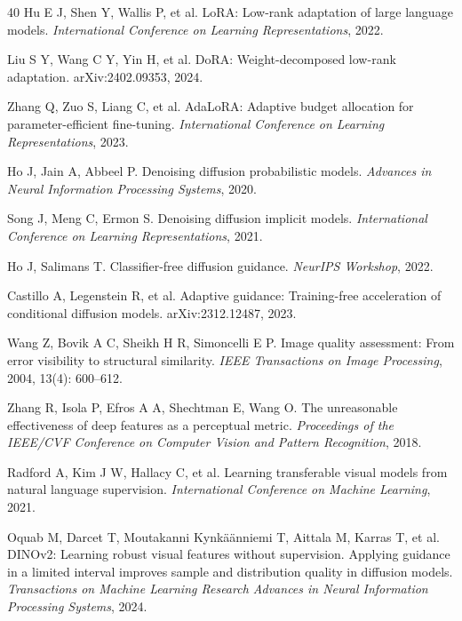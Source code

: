 \documentclass[times,twocolumn,final]{elsarticle}
\providecommand{\DIFadd}[1]{{\protect\color{blue} \sf #1}} %
\providecommand{\DIFdel}[1]{{\protect\color{red} \scriptsize #1}} %
\providecommand{\DIFaddbegin}{} %
\providecommand{\DIFaddend}{} %
\providecommand{\DIFdelbegin}{} %
\providecommand{\DIFdelend}{} %
\newcommand{\DIFscaledelfig}{0.5}
\newlength{\DIFdelgraphicswidth} %
\newlength{\DIFdelgraphicsheight} %
\newcommand{\DIFaddincludegraphics}[2][]{{\color{blue}\fbox{\DIFOincludegraphics[#1]{#2}}}} %
\newcommand{\DIFdelincludegraphics}[2][]{%
\sbox{\DIFdelgraphicsbox}{\DIFOincludegraphics[#1]{#2}}%
\settoboxwidth{\DIFdelgraphicswidth}{\DIFdelgraphicsbox} %
\settoboxtotalheight{\DIFdelgraphicsheight}{\DIFdelgraphicsbox} %
\scalebox{\DIFscaledelfig}{%
\parbox[b]{\DIFdelgraphicswidth}{\usebox{\DIFdelgraphicsbox}\\[-\baselineskip] \rule{\DIFdelgraphicswidth}{0em}}\llap{\resizebox{\DIFdelgraphicswidth}{\DIFdelgraphicsheight}{%
\setlength{\unitlength}{\DIFdelgraphicswidth}%
\begin{picture}(1,1)%
\thicklines\linethickness{2pt} %
{\color[rgb]{1,0,0}\put(0,0){\framebox(1,1){}}}%
{\color[rgb]{1,0,0}\put(0,0){\line( 1,1){1}}}%
{\color[rgb]{1,0,0}\put(0,1){\line(1,-1){1}}}%
\end{picture}%
}\hspace*{3pt}}} %
} %
\DeclareRobustCommand{\DIFaddbegin}{\DIFOaddbegin \let\includegraphics\DIFaddincludegraphics} %
\DeclareRobustCommand{\DIFaddend}{\DIFOaddend \let\includegraphics\DIFOincludegraphics} %
\DeclareRobustCommand{\DIFdelbegin}{\DIFOdelbegin \let\includegraphics\DIFdelincludegraphics} %
\DeclareRobustCommand{\DIFdelend}{\DIFOaddend \let\includegraphics\DIFOincludegraphics} %
\begin{document}
\begin{thebibliography}{40}
Hu E J, Shen Y, Wallis P, et al. LoRA: Low-rank adaptation of large language models. \textit{International Conference on Learning Representations}, 2022.

Liu S Y, Wang C Y, Yin H, et al. DoRA: Weight-decomposed low-rank adaptation. arXiv:2402.09353, 2024.

Zhang Q, Zuo S, Liang C, et al. AdaLoRA: Adaptive budget allocation for parameter-efficient fine-tuning. \textit{International Conference on Learning Representations}, 2023.

Ho J, Jain A, Abbeel P. Denoising diffusion probabilistic models. \textit{Advances in Neural Information Processing Systems}, 2020.

Song J, Meng C, Ermon S. Denoising diffusion implicit models. \textit{International Conference on Learning Representations}, 2021.

Ho J, Salimans T. Classifier-free diffusion guidance. \textit{NeurIPS Workshop}, 2022.

Castillo A, Legenstein R, et al. Adaptive guidance: Training-free acceleration of conditional diffusion models. arXiv:2312.12487, 2023.

\DIFdelbegin %
\DIFdel{Wang Z, Bovik A C, Sheikh H R, Simoncelli E P. Image quality assessment: From error visibility to structural similarity. \textit{IEEE Transactions on Image Processing}, 2004, 13(4): 600--612.
}%

\DIFdel{Zhang R, Isola P, Efros A A, Shechtman E, Wang O. The unreasonable effectiveness of deep features as a perceptual metric. \textit{Proceedings of the IEEE/CVF Conference on Computer Vision and Pattern Recognition}, 2018.
}%

\DIFdel{Radford A, Kim J W, Hallacy C, et al. Learning transferable visual models from natural language supervision. \textit{International Conference on Machine Learning}, 2021.
}%

\DIFdel{Oquab M, Darcet T, Moutakanni }\DIFdelend \DIFaddbegin {}
\DIFadd{Kynk\"a\"anniemi T, Aittala M, Karras }\DIFaddend T, et al. \DIFdelbegin \DIFdel{DINOv2: Learning robust visual features without supervision. }\DIFdelend \DIFaddbegin \DIFadd{Applying guidance in a limited interval improves sample and distribution quality in diffusion models. }\DIFaddend \textit{\DIFdelbegin \DIFdel{Transactions on Machine Learning Research}\DIFdelend \DIFaddbegin \DIFadd{Advances in Neural Information Processing Systems}\DIFaddend }, 2024.


\end{thebibliography}
\end{document}
